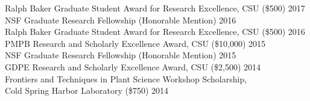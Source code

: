 \documentclass[12pt,english]{article}
\begin{document}
\hspace*{1.0em} Ralph Baker Graduate Student Award for Research Excellence, CSU (\$500)
\hfill 
2017
\vspace{1ex}\\
\hspace*{1.0em} NSF Graduate Research Fellowship (Honorable Mention)
\hfill 
2016
\vspace{1ex}\\
\hspace*{1.0em} Ralph Baker Graduate Student Award for Research Excellence, CSU (\$500)
\hfill 
2016
\vspace{1ex}\\
\hspace*{1.0em} PMPB Research and Scholarly Excellence Award, CSU (\$10,000)
\hfill 
2015
\vspace{1ex}\\
\hspace*{1.0em} NSF Graduate Research Fellowship (Honorable Mention)
\hfill 
2015
\vspace{1ex}\\
\hspace*{1.0em} GDPE Research and Scholarly Excellence Award, CSU (\$2,500)
\hfill 
2014
\vspace{1ex}\\
\hspace*{1.0em}  Frontiers and Techniques in Plant Science Workshop Scholarship,\\ 
\hspace*{1.0em} Cold Spring Harbor Laboratory   (\$750)
\hfill 
2014
\vspace{1ex}


\end{document}
